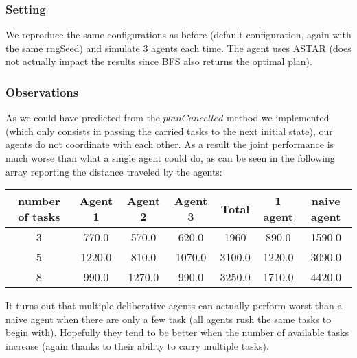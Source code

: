 \documentclass[11pt]{article}
\begin{document}
\subsubsection{Setting}
We reproduce the same configurations as before (default configuration, again with the same rngSeed) and simulate 3 agents each time. The agent uses ASTAR (does not actually impact the results since BFS also returns the optimal plan).

\subsubsection{Observations}

As we could have predicted from the $planCancelled$ method we implemented (which only consists in passing the carried tasks to the next initial state), our agents do not coordinate with each other. As a result the joint performance is much worse than what a single agent could do, as can be seen in the following array reporting the distance traveled by the agents: 

\begin{tabular}{|c|c|c|c|c|c|c|}
\hline 
number of tasks & Agent 1 & Agent 2 & Agent 3 & Total & 1 agent & naive agent \\ 
\hline 
3 & 770.0 & 570.0 & 620.0 & 1960 & 890.0 & 1590.0\\ 
\hline 
5 & 1220.0 & 810.0 & 1070.0 & 3100.0 & 1220.0 & 3090.0\\ 
\hline 
8 & 990.0 & 1270.0 & 990.0 & 3250.0 & 1710.0 & 4420.0\\ 
\hline 
\end{tabular} 

It turns out that multiple deliberative agents can actually perform worst than a naive agent when there are only a few task (all agents rush the same tasks to begin with). Hopefully they tend to be better when the number of available tasks increase (again thanks to their ability to carry multiple tasks). 
\end{document}
